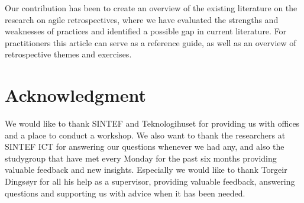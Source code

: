 \documentclass[12pt]{article}
\begin{document}
Our contribution has been to create an overview of the existing literature on the research on agile retrospectives, where we have evaluated the strengths and weaknesses of practices and identified a possible gap in current literature. For practitioners this article can serve as a reference guide, as well as an overview of retrospective themes and exercises. 

\section*{Acknowledgment}
We would like to thank SINTEF and Teknologihuset for providing us with offices and a place to conduct a workshop. We also want to thank the researchers at SINTEF ICT for answering our questions whenever we had any, and also the studygroup that have met every Monday for the past six months providing valuable feedback and new insights. Especially we would like to thank Torgeir Dingsøyr for all his help as a supervisor, providing valuable feedback, answering questions and supporting us with advice when it has been needed.

\clearpage



\end{document}
